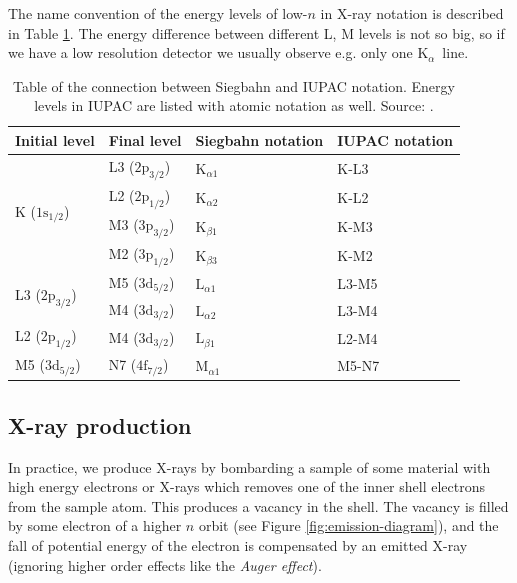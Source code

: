 \documentclass[11pt,a4paper,twoside,onecolumn]{article}
\newcommand{\Kalpha}{$\mathrm{K}_\alpha$~}
\begin{document}
The name convention of the energy levels of low-$n$ in X-ray notation is described in Table \ref{tab:siegbahn-notation}. The energy difference between different L, M levels is not so big, so if we have a low resolution detector we usually observe e.g. only one \Kalpha line.
\begin{table}[!htbp]
    \centering
    \begin{tabular}{@{}llll@{}}
    \toprule
    \multicolumn{1}{c}{Initial level} & \multicolumn{1}{c}{Final level} & \multicolumn{1}{c}{Siegbahn notation} & \multicolumn{1}{c}{IUPAC notation} \\ \midrule
    \multirow{4}{*}{K ($1\mathrm{s}_{1/2}$)}  & L3 ($2\mathrm{p}_{3/2}$) & $\mathrm{K}_{\alpha 1}$ & K-L3  \\
                                              & L2 ($2\mathrm{p}_{1/2}$) & $\mathrm{K}_{\alpha 2}$ & K-L2  \\
                                              & M3 ($3\mathrm{p}_{3/2}$) & $\mathrm{K}_{\beta 1}$  & K-M3  \\
                                              & M2 ($3\mathrm{p}_{1/2}$) & $\mathrm{K}_{\beta 3}$  & K-M2  \\
    \multirow{2}{*}{L3 ($2\mathrm{p}_{3/2}$)} & M5 ($3\mathrm{d}_{5/2}$) & $\mathrm{L}_{\alpha 1}$ & L3-M5 \\
                                              & M4 ($3\mathrm{d}_{3/2}$) & $\mathrm{L}_{\alpha 2}$ & L3-M4 \\
    L2 ($2\mathrm{p}_{1/2}$)                  & M4 ($3\mathrm{d}_{3/2}$) & $\mathrm{L}_{\beta 1}$  & L2-M4 \\
    M5 ($3\mathrm{d}_{5/2}$)                  & N7 ($4\mathrm{f}_{7/2}$) & $\mathrm{M}_{\alpha 1}$ & M5-N7 \\ \bottomrule
    \end{tabular}
    \caption{Table of the connection between Siegbahn and IUPAC notation. Energy levels in IUPAC are listed with atomic notation as well. Source: \cite{Jenkins1991}.}
    \label{tab:siegbahn-notation}
\end{table}

\subsection{X-ray production}\label{subsec:x-ray-production}
In practice, we produce X-rays by bombarding a sample of some material with high energy electrons or X-rays which removes one of the inner shell electrons from the sample atom. This produces a vacancy in the shell. The vacancy is filled by some electron of a higher $n$ orbit (see Figure \ref{fig:emission-diagram}), and the fall of potential energy of the electron is compensated by an emitted X-ray (ignoring higher order effects like the \emph{Auger effect}).
\end{document}
